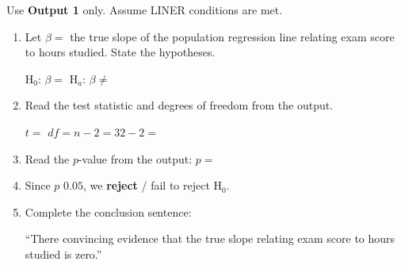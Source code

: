 \documentclass[10pt]{article}
\begin{document}
\begin{tcolorbox}[colback=white, colframe=black!40,
    title=\textbf{Tier R --- Remediate},
    fonttitle=\bfseries, arc=2mm, left=3mm, right=3mm, top=2mm, bottom=2mm]

Use \textbf{Output 1} only. Assume LINER conditions are met.

\begin{enumerate}[label=\alph*.]

  \item Let $\beta =$ the true slope of the population regression line relating exam score
        to hours studied. State the hypotheses.

        H$_0$: $\beta = $  \qquad H$_a$: $\beta \ne $ 

  \item Read the test statistic and degrees of freedom from the output.

        $t = $  \qquad $df = n - 2 = 32 - 2 = $ 

  \item Read the $p$-value from the output: $p = $ 

  \item Since $p$ \ans{$<$} $0.05$, we \quad \textcolor{keyred}{\textbf{reject}} \quad /\quad
        fail to reject \quad H$_0$.

  \item Complete the conclusion sentence:

        ``There  convincing evidence that the true slope relating exam score
        to hours studied is  zero.''

\end{enumerate}
\end{tcolorbox}
\end{document}
